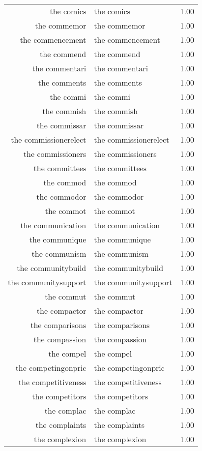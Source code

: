 \begin{table}[ht]
\begin{tabular}{rlr}
  the comics & the comics & 1.00 \\ 
  the commemor & the commemor & 1.00 \\ 
  the commencement & the commencement & 1.00 \\ 
  the commend & the commend & 1.00 \\ 
  the commentari & the commentari & 1.00 \\ 
  the comments & the comments & 1.00 \\ 
  the commi & the commi & 1.00 \\ 
  the commish & the commish & 1.00 \\ 
  the commissar & the commissar & 1.00 \\ 
  the commissionerelect & the commissionerelect & 1.00 \\ 
  the commissioners & the commissioners & 1.00 \\ 
  the committees & the committees & 1.00 \\ 
  the commod & the commod & 1.00 \\ 
  the commodor & the commodor & 1.00 \\ 
  the commot & the commot & 1.00 \\ 
  the communication & the communication & 1.00 \\ 
  the communique & the communique & 1.00 \\ 
  the communism & the communism & 1.00 \\ 
  the communitybuild & the communitybuild & 1.00 \\ 
  the communitysupport & the communitysupport & 1.00 \\ 
  the commut & the commut & 1.00 \\ 
  the compactor & the compactor & 1.00 \\ 
  the comparisons & the comparisons & 1.00 \\ 
  the compassion & the compassion & 1.00 \\ 
  the compel & the compel & 1.00 \\ 
  the competingonpric & the competingonpric & 1.00 \\ 
  the competitiveness & the competitiveness & 1.00 \\ 
  the competitors & the competitors & 1.00 \\ 
  the complac & the complac & 1.00 \\ 
  the complaints & the complaints & 1.00 \\ 
  the complexion & the complexion & 1.00 \\ 

\end{tabular}
\end{table}
